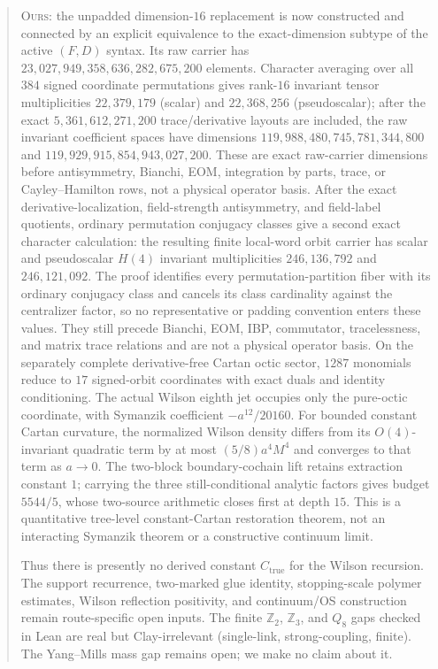 \documentclass[11pt]{article}
\theoremstyle{definition}
\begin{document}
\begin{abstract}
\textsc{Ours:} the unpadded dimension-$16$ replacement is now constructed
and connected by an explicit equivalence to the exact-dimension subtype of
the active $(F,D)$ syntax. Its raw carrier has
$23{,}027{,}949{,}358{,}636{,}282{,}675{,}200$ elements. Character averaging
over all $384$ signed coordinate permutations gives rank-$16$ invariant
tensor multiplicities $22{,}379{,}179$ (scalar) and $22{,}368{,}256$
(pseudoscalar); after the exact
$5{,}361{,}612{,}271{,}200$ trace/derivative layouts are included, the raw
invariant coefficient spaces have dimensions
$119{,}988{,}480{,}745{,}781{,}344{,}800$ and
$119{,}929{,}915{,}854{,}943{,}027{,}200$. These are exact raw-carrier
dimensions before antisymmetry, Bianchi, EOM, integration by parts, trace,
or Cayley--Hamilton rows, not a physical operator basis. After the exact
derivative-localization, field-strength antisymmetry, and field-label
quotients, ordinary permutation conjugacy classes give a second exact
character calculation: the resulting finite local-word orbit carrier has
scalar and pseudoscalar $H(4)$ invariant multiplicities
$246{,}136{,}792$ and $246{,}121{,}092$. The proof identifies every
permutation-partition fiber with its ordinary conjugacy class and cancels its
class cardinality against the centralizer factor, so no representative or
padding convention enters these values. They still precede Bianchi, EOM,
IBP, commutator, tracelessness, and matrix trace relations and are not a
physical operator basis. On the separately
complete derivative-free Cartan octic sector, $1287$ monomials reduce to
$17$ signed-orbit coordinates with exact duals and identity conditioning.
The actual Wilson eighth jet occupies only the pure-octic coordinate, with
Symanzik coefficient $-a^{12}/20160$. For bounded constant Cartan curvature,
the normalized Wilson density differs from its $O(4)$-invariant quadratic
term by at most $(5/8)a^4M^4$ and converges to that term as $a\to0$. The
two-block boundary-cochain lift retains extraction constant $1$; carrying the
three still-conditional analytic factors gives budget $5544/5$, whose
two-source arithmetic closes first at depth $15$. This is a quantitative
tree-level constant-Cartan restoration theorem, not an interacting
Symanzik theorem or a constructive continuum limit.

Thus there is presently no derived constant $C_{\mathrm{true}}$ for the Wilson
recursion. The support recurrence, two-marked glue identity, stopping-scale
polymer estimates, Wilson reflection positivity, and continuum/OS construction
remain route-specific open inputs. The finite $\mathbb{Z}_2$, $\mathbb{Z}_3$,
and $Q_8$ gaps checked in Lean are real but Clay-irrelevant
(single-link, strong-coupling, finite). The Yang--Mills mass gap remains open;
we make no claim about it.
\end{abstract}
\end{document}
